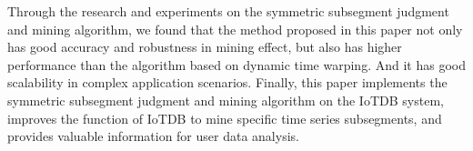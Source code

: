 \begin{abstract*}
  Through the research and experiments on the 
  symmetric subsegment judgment and mining algorithm, 
  we found that the method proposed in this paper 
  not only has good accuracy and robustness in 
  mining effect, but also has higher performance 
  than the algorithm based on dynamic time warping. 
  And it has good scalability in complex application 
  scenarios. Finally, this paper implements the 
  symmetric subsegment judgment and mining algorithm 
  on the IoTDB system, improves the function of IoTDB 
  to mine specific time series subsegments, and 
  provides valuable information for user data analysis.

\end{abstract*}
